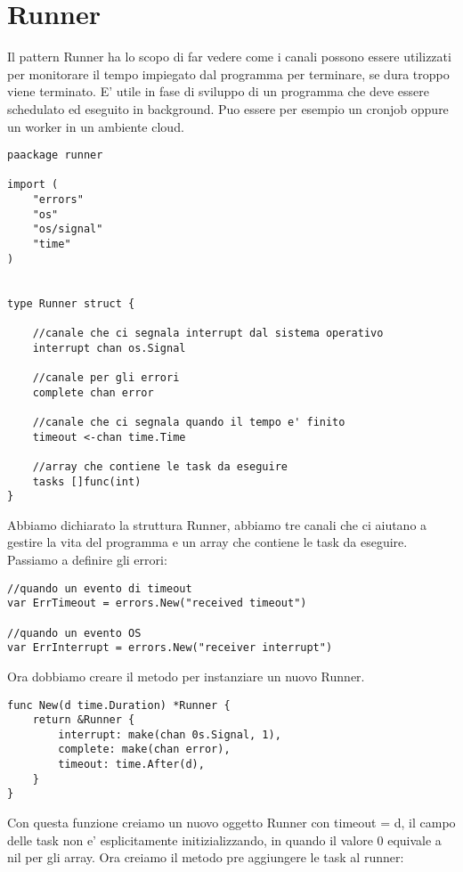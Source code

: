 \section{Runner}

Il pattern Runner ha lo scopo di far vedere come i canali possono essere utilizzati per monitorare il tempo impiegato dal programma per terminare, se dura troppo viene terminato. \newline
E' utile in fase di sviluppo di un programma che deve essere schedulato ed eseguito in background. Puo essere per esempio un cronjob oppure un worker in un ambiente cloud.

\begin{lstlisting}
paackage runner

import (
    "errors"
    "os"
    "os/signal"
    "time"
)


type Runner struct {

    //canale che ci segnala interrupt dal sistema operativo
    interrupt chan os.Signal
    
    //canale per gli errori
    complete chan error
    
    //canale che ci segnala quando il tempo e' finito
    timeout <-chan time.Time
    
    //array che contiene le task da eseguire
    tasks []func(int)
}
\end{lstlisting}

Abbiamo dichiarato la struttura Runner, abbiamo tre canali che ci aiutano a gestire la vita del programma e un array che contiene le task da eseguire. \newline
Passiamo a definire gli errori:

\begin{lstlisting}
//quando un evento di timeout
var ErrTimeout = errors.New("received timeout")

//quando un evento OS
var ErrInterrupt = errors.New("receiver interrupt")
\end{lstlisting}

Ora dobbiamo creare il metodo per instanziare un nuovo Runner. 

\begin{lstlisting}
func New(d time.Duration) *Runner {
    return &Runner {
        interrupt: make(chan 0s.Signal, 1),
        complete: make(chan error),
        timeout: time.After(d),
    }
}
\end{lstlisting}

Con questa funzione creiamo un nuovo oggetto Runner con timeout = d, il campo delle task non e' esplicitamente initizializzando, in quando il valore 0 equivale a nil per gli array. \newline
Ora creiamo il metodo pre aggiungere le task al runner:

